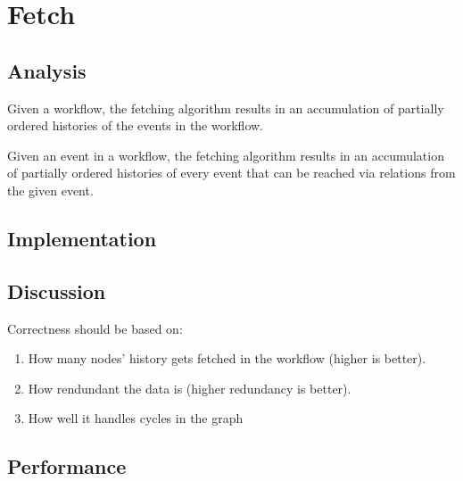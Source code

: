 \section{Fetch}
\subsection{Analysis} %
Given a workflow, the fetching algorithm results in an accumulation of partially ordered histories of the events in the workflow.

Given an event in a workflow, the fetching algorithm results in an accumulation of partially ordered histories of every event that can be reached via relations from the given event. %


\subsection{Implementation} %

\subsection{Discussion} %
Correctness should be based on:
\begin{enumerate}
    \item How many nodes' history gets fetched in the workflow (higher is better).
    \item How rendundant the data is (higher redundancy is better).
    \item How well it handles cycles in the graph
\end{enumerate}

\subsection{Performance} %
